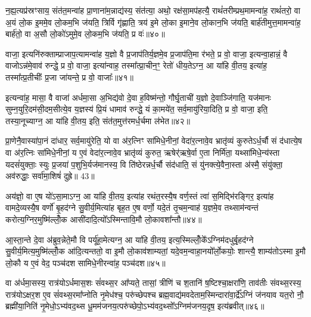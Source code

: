 न॒ह्य॒त्यप्र॑स्रꣳसाय॒ संत॑त॒मन्वा॑ह प्रा॒णाना॑म॒न्नाद्य॑स्य॒ संत॑त्या॒ अथो॒ रक्ष॑सा॒मप॑हत्यै॒ राथं॑तरीम्प्रथ॒मामन्वा॑ह॒ राथं॑तरो॒ वा अ॒यं लो॒क इ॒ममे॒व लो॒कम॒भि ज॑यति॒ त्रिर्वि गृ॑ह्णाति॒ त्रय॑ इ॒मे लो॒का इ॒माने॒व लो॒कान॒भि ज॑यति॒ बार्\mbox{}ह॑तीमुत्त॒मामन्वा॑ह॒ बार्\mbox{}ह॑तो॒ वा अ॒सौ लो॒को॑\-ऽमुमे॒व लो॒कम॒भि ज॑यति॒ प्र वः॑॥४०॥

वाजा॒ इत्यनि॑रुक्ताम्प्राजाप॒त्यामन्वा॑ह य॒ज्ञो वै प्र॒जाप॑तिर्य॒ज्ञमे॒व प्र॒जाप॑ति॒मा र॑भते॒ प्र वो॒ वाजा॒ इत्यन्वा॒हान्नं॒ वै वाजो\-ऽन्न॑मे॒वाव॑ रुन्द्धे॒ प्र वो॒ वाजा॒ इत्या॑न्वाह॒ तस्मा᳚त्प्रा॒चीन॒ꣳ॒ रेतो॑ धीय॒ते\-ऽग्न॒ आ या॑हि वी॒तय॒ इत्या॑ह॒ तस्मा᳚त्प्र॒तीचीः᳚ प्र॒जा जा॑यन्ते॒ प्र वो॒ वाजाः᳚॥४१॥

इत्यन्वा॑ह॒ मासा॒ वै वाजा॑ अर्धमा॒सा अ॒भिद्य॑वो दे॒वा ह॒विष्म॑न्तो॒ गौर्घृ॒ताची॑ य॒ज्ञो दे॒वाञ्जि॑गाति॒ यज॑मानः सुम्न॒युरि॒दम॑सी॒दम॒सीत्ये॒व य॒ज्ञस्य॑ प्रि॒यं धामाव॑ रुन्द्धे॒ यं का॒मये॑त॒ सर्व॒मायु॑रिया॒दिति॒ प्र वो॒ वाजा॒ इति॒ तस्या॒नूच्याग्न॒ आ या॑हि वी॒तय॒ इति॒ संत॑त॒मुत्त॑रमर्ध॒र्चमा ल॑भेत॥४२॥

प्रा॒णेनै॒वास्या॑पा॒नं दा॑धार॒ सर्व॒मायु॑रेति॒ यो वा अ॑र॒त्निꣳ सा॑मिधे॒नीनां॒ वेदा॑र॒त्नावे॒व भ्रातृ॑व्यं कुरुते\-ऽर्ध॒र्चौ सं द॑धात्ये॒ष वा अ॑र॒त्निः सा॑मिधे॒नीनां॒ य ए॒वं वेदा॑र॒त्नावे॒व भ्रातृ॑व्यं कुरुत॒ ऋषेर्\mbox{}॑ऋषे॒र्वा ए॒ता निर्मि॑ता॒ यथ्सा॑मिधे॒न्य॑स्ता यदसं॑युक्ताः॒ स्युः प्र॒जया॑ प॒शुभि॒र्यज॑मानस्य॒ वि ति॑ष्ठेरन्नर्ध॒र्चौ संद॑धाति॒ सं यु॑नक्त्ये॒वैना॒स्ता अ॑स्मै॒ संयु॑क्ता॒ अव॑रुद्धाः॒ सर्वा॑मा॒शिषं॑ दुह्रे॥ 43॥

{\anuvakamend[{ब॒र्\mbox{}सं वो॑ जायन्ते॒ प्र वो॒ वाजा॑ लभेत दधाति॒ सन्दश॑ च॥७॥}]}

अय॑ज्ञो॒ वा ए॒ष यो॑\-ऽसा॒मा\-ऽग्न॒ आ या॑हि वी॒तय॒ इत्या॑ह रथंत॒रस्यै॒ष वर्ण॒स्तं त्वा॑ स॒मिद्भि॑रङ्गिर॒ इत्या॑ह वामदे॒व्यस्यै॒ष वर्णो॑ बृ॒हद॑ग्ने सु॒वीर्य॒मित्या॑ह बृह॒त ए॒ष वर्णो॒ यदे॒तं तृ॒चम॒न्वाह॑ य॒ज्ञमे॒व तथ्साम॑न्वन्तं करोत्य॒ग्निर॒मुष्मि॑ल्लोँ॒क आसी॑दादि॒त्यो᳚\-ऽस्मिन्तावि॒मौ लो॒कावशा᳚न्तौ॥४४॥

आ॒स्ता॒न्ते दे॒वा अ॑ब्रुव॒न्नेते॒मौ वि पर्यू॑हा॒मेत्यग्न॒ आ या॑हि वी॒तय॒ इत्य॒स्मिल्लोँ॒के᳚\-ऽग्निम॑दधुर्बृ॒हद॑ग्ने सु॒वीर्य॒मित्य॒मुष्मि॑ल्लोँ॒क आ॑दि॒त्यन्ततो॒ वा इ॒मौ लो॒काव॑शाम्यतां॒ यदे॒वम॒न्वाहा॒नयो᳚र्लो॒कयोः॒ शान्त्यै॒ शाम्य॑तो\-ऽस्मा इ॒मौ लो॒कौ य ए॒वं वेद॒ पञ्च॑दश सामिधे॒नीरन्वा॑ह॒ पञ्च॑दश॥४५॥

वा अ॑र्धमा॒सस्य॒ रात्र॑यो\-ऽर्धमास॒शः सं॑वथ्स॒र आ᳚प्यते॒ तासां॒ त्रीणि॑ च श॒तानि॑ ष॒ष्टिश्चा॒क्षरा॑णि॒ ताव॑तीः संवथ्स॒रस्य॒ रात्र॑यो\-ऽक्षर॒श ए॒व सं॑वथ्स॒रमा᳚प्नोति नृ॒मेध॑श्च॒ परु॑च्छेपश्च ब्रह्म॒वाद्य॑मवदेताम॒स्मिन्दारा॑वा॒र्द्रे᳚\-ऽग्निं ज॑नयाव यत॒रो नौ॒ ब्रह्मी॑या॒निति॑ नृ॒मेधो॒\-ऽभ्य॑वद॒थ्स धू॒मम॑जनय॒त्परु॑च्छेपो॒\-ऽभ्य॑वद॒थ्सो᳚\-ऽग्निम॑जनय॒दृष॒ इत्य॑ब्रवीत्॥४६॥

